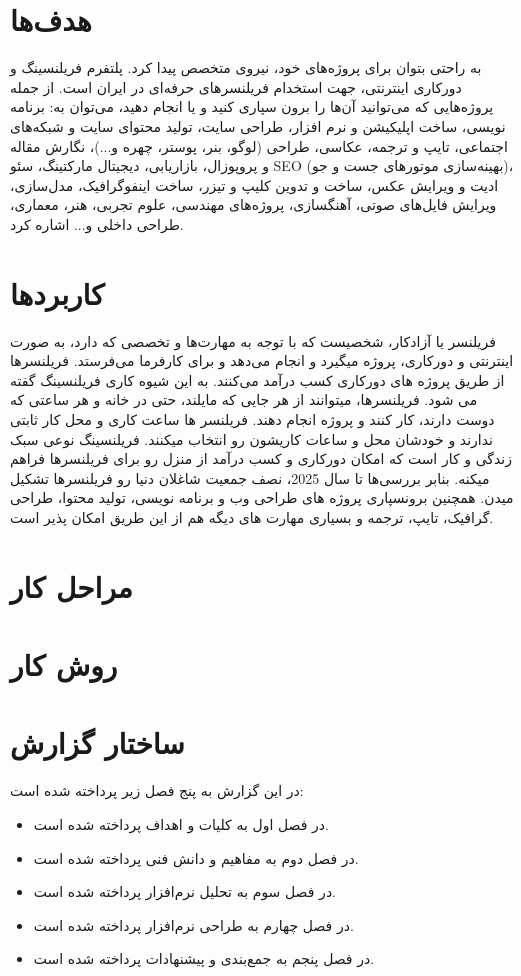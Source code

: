 \section{هدف‌ها}
به راحتی بتوان برای پروژه‌های خود، نیروی متخصص پیدا کرد.
 پلتفرم فریلنسینگ و دورکاری اینترنتی، جهت استخدام فریلنسرهای حرفه‌ای در ایران است. از جمله پروژه‌هایی که می‌توانید آن‌ها را برون سپاری کنید و یا انجام دهید، می‌توان به: برنامه نویسی، ساخت اپلیکیشن و نرم افزار، طراحی سایت، تولید محتوای سایت و شبکه‌های اجتماعی، تایپ و ترجمه، عکاسی، طراحی (لوگو، بنر، پوستر، چهره و...)، نگارش مقاله و پروپوزال، بازاریابی، دیجیتال مارکتینگ، سئو SEO (بهینه‌سازی موتورهای جست و جو)، ادیت و ویرایش عکس، ساخت و تدوین کلیپ و تیزر، ساخت اینفوگرافیک، مدل‌سازی، ویرایش فایل‌های صوتی، آهنگسازی، پروژه‌های مهندسی، علوم تجربی، هنر، معماری، طراحی داخلی و... اشاره کرد.

\section{کاربردها}
فریلنسر یا آزادکار، شخصیست که با توجه به مهارت‌ها و تخصصی که دارد، به صورت اینترنتی و دورکاری، پروژه میگیرد و انجام می‌دهد و برای کارفرما می‌فرستد. فریلنسرها از طریق پروژه های دورکاری کسب درآمد می‌کنند. به این شیوه کاری فریلنسینگ گفته می شود. فریلنسرها، میتوانند از هر جایی که مایلند، حتی در خانه و هر ساعتی که دوست دارند، کار کنند و پروژه انجام دهند. فریلنسر ها ساعت کاری و محل کار ثابتی ندارند و خودشان محل و ساعات کاریشون رو انتخاب میکنند. فریلنسینگ نوعی سبک زندگی و کار است که امکان دورکاری و کسب درآمد از منزل رو برای فریلنسرها فراهم میکنه. بنابر بررسی‌ها تا سال 2025، نصف جمعیت شاغلان دنیا رو فریلنسرها تشکیل میدن. همچنین برونسپاری پروژه های طراحی وب و برنامه نویسی، تولید محتوا، طراحی گرافیک، تایپ، ترجمه و بسیاری مهارت های دیگه هم از این طریق امکان پذیر است.
\section{مراحل کار}

\section{روش کار}

\section{ساختار گزارش}
در این گزارش به پنج فصل زیر پرداخته شده است:
\begin{itemize}
	\item
	در فصل اول به کلیات و اهداف پرداخته شده است.
	\item
	در فصل دوم به مفاهیم و دانش فنی پرداخته شده است.
	\item
	در فصل سوم به تحلیل نرم‌افزار پرداخته شده است.
	\item
	در فصل چهارم به طراحی نرم‌افزار پرداخته شده است.
	\item
	در فصل پنجم به جمع‌بندی و پیشنهادات پرداخته شده است.
\end{itemize}
